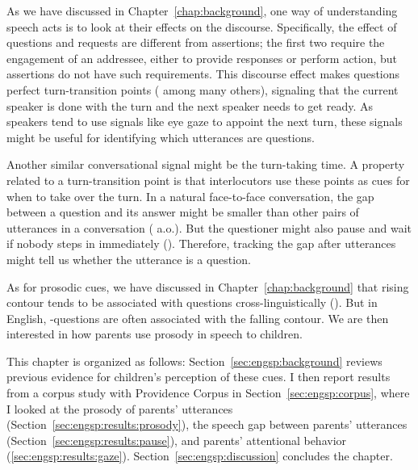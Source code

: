 

As we have discussed in Chapter~\ref{chap:background}, one way of understanding speech acts is to look at their effects on the discourse. Specifically, the effect of questions and requests are different from assertions; the first two require the engagement of an addressee, either to provide responses or perform action, but assertions do not have such requirements. This discourse effect makes questions perfect turn-transition points (\cite{duncan1972turn} among many others), signaling that the current speaker is done with the turn and the next speaker needs to get ready. As speakers tend to use signals like eye gaze to appoint the next turn, these signals might be useful for identifying which utterances are questions. 

Another similar conversational signal might be the turn-taking time. A property related to a turn-transition point is that interlocutors use these points as cues for when to take over the turn. In a natural face-to-face conversation, the gap between a question and its answer might be smaller than other pairs of utterances in a conversation (\citealt{tice2011turn} a.o.). But the questioner might also pause and wait if nobody steps in immediately (\cite{sacks1978pause}). Therefore, tracking the gap after utterances might tell us whether the utterance is a question.

As for prosodic cues, we have discussed in Chapter~\ref{chap:background} that rising contour tends to be associated with questions cross-linguistically (\cite{gussenhovenchen2000}). But in English, \twh-questions are often associated with the falling contour. We are then interested in how parents use prosody in speech to children.

This chapter is organized as follows: Section~\ref{sec:engsp:background} reviews previous evidence for children's perception of these cues. I then report results from a corpus study with Providence Corpus in Section~\ref{sec:engsp:corpus}, where I looked at the prosody of parents' utterances (Section~\ref{sec:engsp:results:prosody}), the speech gap between parents' utterances (Section~\ref{sec:engsp:results:pause}), and parents' attentional behavior (\ref{sec:engsp:results:gaze}).
Section~\ref{sec:engsp:discussion} concludes the chapter.


